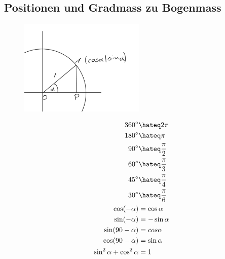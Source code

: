 \documentclass[a4paper,onecolumn,pdftex]{report}
\begin{document}
    \subsection*{Positionen und Gradmass zu Bogenmass}
    \begin{figure}
        \includegraphics[width=6cm]{2023-10-10_21h42_30.png}
    \end{figure}
    \begin{align*}
        360^\circ &\hateq 2\pi \\
        180^\circ &\hateq \pi \\
        90^\circ &\hateq \frac{\pi}{2} \\
        60^\circ &\hateq \frac{\pi}{3} \\
        45^\circ &\hateq \frac{\pi}{4} \\
        30^\circ &\hateq \frac{\pi}{6} \\
        \cos(-\alpha) &= \cos\alpha \\
        \sin(-\alpha) &= -\sin\alpha \\
        \sin(90-\alpha) &= cos\alpha \\
        \cos(90-\alpha) &= \sin\alpha \\
        \sin^2\alpha + \cos^2\alpha &= 1
    \end{align*}
\end{document}
